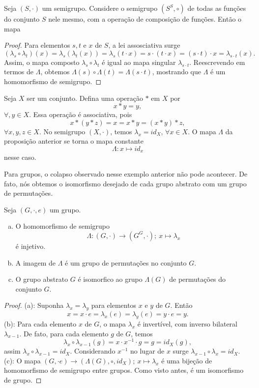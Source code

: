 \begin{stat}
  Seja $(S,\cdot)$ um semigrupo. Considere o semigrupo $(S^{S}, \circ)$ de todas as funções do conjunto $S$ nele mesmo, com a operação de composição de funções. Então o mapa
  \begin{proof}
    Para elementos $s,t$ e $x$ de $S$, a lei assosciativa surge $$(\lambda_{s} \circ \lambda_{t})(x) = \lambda_{s}(\lambda_{t}(x)) = \lambda_{s}(t\cdot x) = s \cdot (t \cdot x) = (s \cdot t) \cdot x = \lambda_{s\cdot t } (x).$$
    Assim, o mapa composto $\lambda_{s} \circ \lambda_{t}$ é igual ao mapa singular $\lambda_{s\cdot t}$. Reescrevendo em termos de $\Lambda$, obtemos $\Lambda(s) \circ \Lambda (t) = \Lambda(s\cdot t)$, mostrando que $\Lambda$ é um homomorfismo de semigrupo.
  \end{proof}
\end{stat}
\begin{exmp}
  Seja $X$ ser um conjunto. Defina uma operação $*$ em $X$ por $$x * y = y,$$ $\forall, y \in X$. Essa operação é associativa, pois $$x * (y * z) = x = x * y = (x * y) * z,$$ $\forall x, y , z \in X$. No semigrupo $(X, \cdot)$, temos $\lambda_{x} = id_{X}$, $\forall x \in X$. O mapa $\Lambda$ da proposição anterior se torna o mapa constante $$\Lambda: x \mapsto id_{x}$$ nesse caso.
\end{exmp}
Para grupos, o colapso observado nesse exemplo anterior não pode acontecer. De fato, nós obtemos o isomorfismo desejado de cada grupo abstrato com um grupo de permutações.

\begin{theorem}
  Seja $(G, \cdot , e)$ um grupo.
  \begin{enumerate}[(a)]
    \item O homomorfismo de semigrupo $$\Lambda: (G, \cdot) \to (G^{G}, \cdot);\ x\mapsto \lambda_{x}$$ é injetivo.
    \item A imagem de $\Lambda$ é um grupo de permutações no conjunto $G$.
    \item O grupo abstrato $G$ é isomorfico ao grupo $\Lambda(G)$ de permutações do conjunto $G$.
  \end{enumerate}
  \begin{proof}
    (a): Suponha $\lambda_{x} = \lambda_{y}$ para elementos $x$ e $y$ de $G$. Então 
    $$x = x \cdot e = \lambda_{x}(e) = \lambda_{y}(e) = y \cdot e = y.$$ (b): Para cada elemento $x$ de $G$, o mapa $\lambda_{x}$ é invertível, com inverso bilateral $\lambda_{x-1}.$ De fato, para cada elemento $g$ de $G$, temos 
    $$\lambda_{x}\circ \lambda_{x-1}(g) = x \cdot x^{-1} \cdot g = g = id_{X}(g),$$ assim $\lambda_{x}\circ \lambda_{x-1} = id_{X}$. Considerando $x^{-1}$ no lugar de $x$ surge $\lambda_{x-1} \circ \lambda_{x} = id_{X}.$
    (c): O mapa $(G,\cdot e) \to (\Lambda(G), \circ, id_{X});\ x \mapsto \lambda_{x}$ é uma bijeção de homomorfismo de semigrupo entre grupos. Como visto antes, é um isomorfismo de grupo.
  \end{proof}
\end{theorem}

